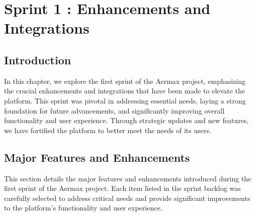 \chapter{ Sprint 1 : Enhancements and Integrations}
\setcounter{secnumdepth}{0}

\section{Introduction}
In this chapter, we explore the first sprint of the Aermax project, emphasizing the crucial enhancements and integrations that have been made to elevate the platform. This sprint was pivotal in addressing essential needs, laying a strong foundation for future advancements, and significantly improving overall functionality and user experience. Through strategic updates and new features, we have fortified the platform to better meet the needs of its users.\setcounter{secnumdepth}{3} 
\section{Major Features and Enhancements}
This section details the major features and enhancements introduced during the first sprint of the Aermax project. Each item listed in the sprint backlog was carefully selected to address critical needs and provide significant improvements to the platform's functionality and user experience.
